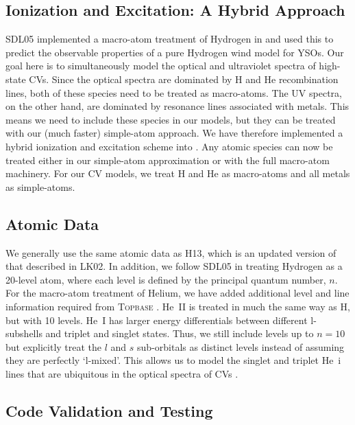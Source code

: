 \documentclass[preprint, a4paper, 11pt]{aastex}
\begin{document}
\subsection{Ionization and Excitation: A Hybrid Approach}

SDL05 implemented a macro-atom treatment of Hydrogen in \py and used
this to predict the observable properties of a pure Hydrogen wind
model for YSOs. Our goal here is to simultaneously model the optical
and ultraviolet spectra of high-state CVs. Since the optical spectra
are dominated by H and He recombination lines, both of these species
need to be treated as macro-atoms. The UV spectra, on the other hand,
are dominated by resonance lines associated with metals. This means we
need to include these species in our models, but they can be treated 
with our (much faster) simple-atom approach. We have therefore
implemented a hybrid ionization and excitation scheme into \py. Any
atomic species can now be treated either in our simple-atom
approximation or with the full macro-atom machinery. For our CV
models, we treat H and He as macro-atoms and all metals as
simple-atoms.  

\subsection{Atomic Data}

We generally use the same atomic data as H13, which is an updated
version of that described in LK02. In addition, we follow SDL05 in
treating Hydrogen as a 20-level atom, where each level is defined by
the principal quantum number, $n$. For the macro-atom treatment of
Helium,  we have added additional level and line information required 
from \textsc{Topbase} \citep{topbase2005}.  He~\textsc{II} is treated
in much the same way as H, but with 10 levels. He~\textsc{I} has
larger energy differentials between different l-subshells and triplet
and singlet states. Thus, we still include levels up to $n=10$ but
explicitly treat the $l$ and $s$ sub-orbitals as distinct levels
instead of assuming they are perfectly `l-mixed'. This allows us
to model the singlet and  triplet He~{\sc i} lines that are ubiquitous
in the optical spectra of CVs \citep[e.g.][]{dhillon1996}.


\subsection{Code Validation and Testing}
\end{document}

